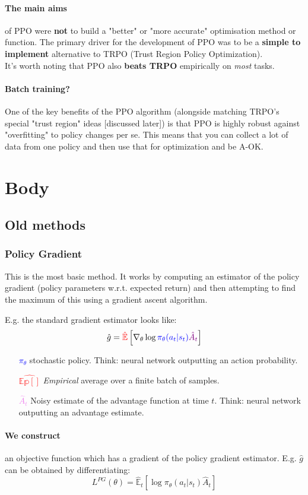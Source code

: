 \documentclass{article}
\begin{document}
\paragraph{The main aims} of PPO were \textbf{not} to build a "better" or "more accurate" optimisation method or function. The primary driver for the development of PPO was to be a \textbf{simple to implement} alternative to TRPO (Trust Region Policy Optimization). \\ 
It's worth noting that PPO also \textbf{beats TRPO} empirically on \emph{most} tasks. 

\paragraph{Batch training?} One of the key benefits of the PPO algorithm (alongside matching TRPO's special "trust region" ideas [discussed later]) is that PPO is highly robust against "overfitting" to policy changes per se.  This means that you can collect a lot of data from one policy and then use that for optimization and be A-OK. 

\section{Body}

\subsection{Old methods}

\subsubsection{Policy Gradient}

This is the most basic method. It works by computing an estimator of the policy gradient (policy parameters w.r.t. expected return) and then attempting to find the maximum of this using a gradient ascent algorithm.

E.g. the standard gradient estimator looks like:
\[ \hat{g} = \textcolor{red}{\hat{\mathbb{E}}} \left [ \nabla_\theta \log \textcolor{blue}{\pi_\theta (a_t | s_t)} \textcolor{violet}{\hat{A}_t} \right ] \]

\begin{itemize}
    \item[\textcolor{blue}{\(\pi_\theta\)}] stochastic policy. Think: neural network outputting an action probability.
    \item[\textcolor{red}{\(\hat{\mathbb{Ep[]}}\)}] \emph{Empirical} average over a finite batch of samples.
    \item[\textcolor{violet}{\(\hat{A}_t\)}] Noisy estimate of the advantage function at time \(t\). Think: neural network outputting an advantage estimate.
\end{itemize}
\paragraph{We construct} an objective function which has a gradient of the policy gradient estimator. E.g. \(\hat{g}\) can be obtained by differentiating:
\[L^{PG} (\theta) = \hat{\mathbb{E}}_t \left [ \log\pi_\theta (a_t | s_t) \hat{A}_t \right] \]
\end{document}
